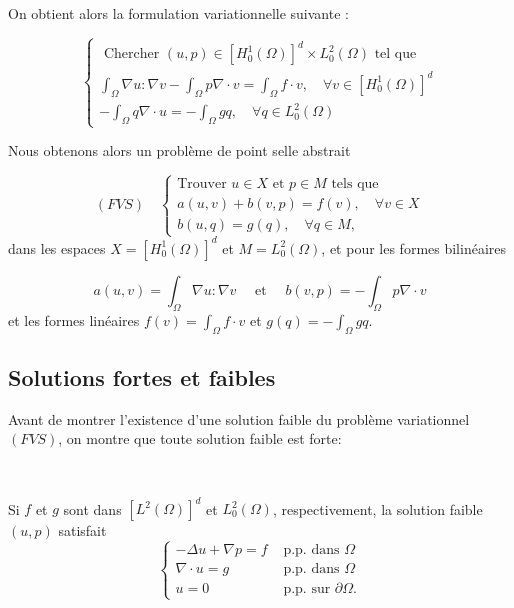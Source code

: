 On obtient alors la formulation variationnelle suivante : 

$$
\left\{\begin{array}{c}
\text { Chercher }(u, p) \in\left[H_{0}^{1}(\Omega)\right]^{d} \times L_{0}^{2}(\Omega) \text { tel que } \\
\int_{\Omega} \nabla u: \nabla v-\int_{\Omega} p \nabla \cdot v=\int_{\Omega} f \cdot v, \quad \forall v \in\left[H_{0}^{1}(\Omega)\right]^{d} \\
-\int_{\Omega} q \nabla \cdot u 
=-\int_{\Omega} g q, \quad \forall q \in L_{0}^{2}(\Omega)
\end{array}\right.
$$

Nous obtenons alors un problème de point selle abstrait 

$$
(FVS)\quad \left\{\begin{array}{l}
\text {Trouver  } u \in X \text { et  } p \in M \text { tels que  } \\
a(u, v)+b(v, p)=f(v), \quad \forall v \in X \\
b(u, q)=g(q), \quad \forall q \in M, 
\end{array}\right.
$$
dans les espaces 
$X=\left[H_{0}^{1}(\Omega)\right]^{d}$ et $M=L_{0}^{2}(\Omega)$, et pour les formes bilinéaires

$$
a(u, v)=\int_{\Omega} \nabla u: \nabla v \quad \text { et } \quad b(v, p)=-\int_{\Omega} p \nabla \cdot v
$$
et les formes linéaires $f(v)=\int_{\Omega} f \cdot v$ et $g(q)=-\int_{\Omega} g q$.

\subsection{Solutions fortes et faibles} 


Avant de montrer l'existence d'une solution faible du problème variationnel $(FVS)$, on montre que toute solution faible est forte:


\begin{proposition}\
	
 Si $f$ et $g$ sont dans $\left[L^{2}(\Omega)\right]^{d}$ et $L_{0}^{2}(\Omega)$, respectivement, la solution faible $(u, p)$  satisfait
$$
\left\{\begin{aligned}
-\Delta u+\nabla p=f & \text { p.p. dans  } \Omega \\
\nabla \cdot u=g & \text { p.p.  dans  } \Omega \\
u=0 & \text { p.p.  sur  } \partial \Omega.
\end{aligned}\right.
$$

\end{proposition}


